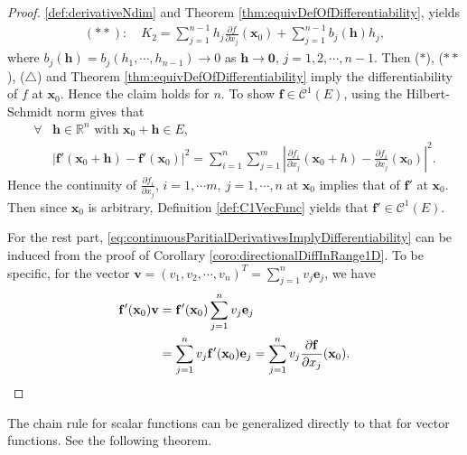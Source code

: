 \begin{proof}
  \ref{def:derivativeNdim} and Theorem \ref{thm:equivDefOfDifferentiability},
  yields
  \begin{align*}
    (**):\quad
    K_{2}=\sum_{j=1}^{n-1}h_{j}\frac{\partial f}{\partial x_j}(\mathbf{x}_{0})
    +\sum_{j=1}^{n-1}b_{j}(\mathbf{h})h_{j},
  \end{align*}
  where $b_{j}(\mathbf{h})=b_{j}(h_{1},\cdots, h_{n-1})
  \rightarrow 0$ as $\mathbf{h}\rightarrow \mathbf{0}$,
  $j=1,2,\cdots, n-1$. Then ($*$), ($**$), ($\triangle$) and
  Theorem \ref{thm:equivDefOfDifferentiability} imply
  the differentiability of $f$ at $\mathbf{x}_{0}$.
  Hence the claim holds for $n$.
  To show $\mathbf{f}\in \mathcal{C}^{1}(E)$,
  using the Hilbert-Schmidt norm gives that
  \begin{align*}
    \forall &\mathbf{h}\in \mathbb{R}^{n}\text{ with }
    \mathbf{x}_{0}+\mathbf{h}\in E,\\
    &|\mathbf{f}'(\mathbf{x}_{0}+\mathbf{h})
    -\mathbf{f}'(\mathbf{x}_{0})|^{2}
    = \sum_{i=1}^{n}\sum_{j=1}^{m} \left|
    \frac{\partial f_{i}}{\partial x_{j}}(\mathbf{x}_{0}+h)
    -\frac{\partial f_{i}}{\partial x_{j}}(\mathbf{x}_{0})\right|^{2}.
  \end{align*}
  Hence the continuity of $\frac{\partial f_{i}}{\partial x_{j}}$,
  $i=1,\cdots m,\ j=1,\cdots, n$ at $\mathbf{x}_{0}$
  implies that of $\mathbf{f}'$ at $\mathbf{x}_{0}$.
  Then since $\mathbf{x}_{0}$ is arbitrary,
  Definition \ref{def:C1VecFunc} yields that
  $\mathbf{f}'\in \mathcal{C}^{1}(E).$

  For the rest part,
  \eqref{eq:continuousParitialDerivativesImplyDifferentiability}
  can be induced from the proof of
  Corollary \ref{coro:directionalDiffInRange1D}.
  To be specific, for the vector
  $\mathbf{v}=(v_{1},v_{2},\cdots,v_{n})^{T}
  =\sum_{j=1}^{n}v_{j}\mathbf{e}_{j}$, we have
  \begin{align*}
    \mathbf{f}'(\mathbf{x}_{0})\mathbf{v}
    &=\mathbf{f}'(\mathbf{x}_{0})\sum_{j=1}^{n}v_{j}\mathbf{e}_{j}\\
    &=\sum_{j=1}^{n}v_{j}\mathbf{f}'(\mathbf{x}_{0})\mathbf{e}_{j}
    =\sum_{j=1}^{n}v_{j}\frac{\partial \mathbf{f}}{\partial x_{j}}
    (\mathbf{x}_{0}).\qedhere
  \end{align*}
\end{proof}

\begin{rem}
  The chain rule for scalar functions can be generalized directly to that
  for vector functions. See the following theorem.
\end{rem}


